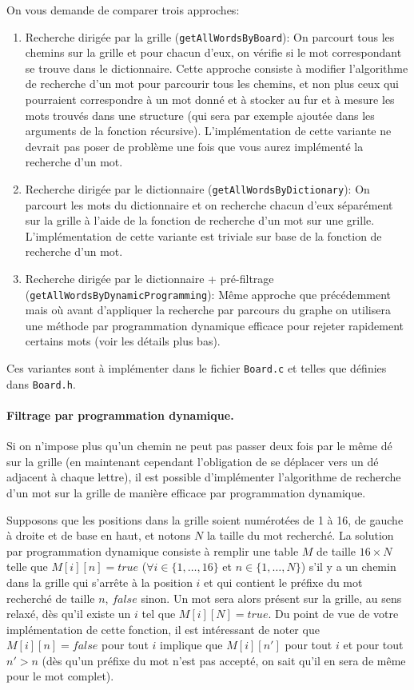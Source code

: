 \documentclass[a4paper,10pt]{article}
\begin{document}
On vous demande de comparer trois approches:
\begin{enumerate}
\item Recherche dirigée par la grille (\texttt{getAllWordsByBoard}): On parcourt tous les chemins
  sur la grille et pour chacun d'eux, on vérifie si le mot
  correspondant se trouve dans le dictionnaire. Cette approche consiste
  à modifier l'algorithme de recherche d'un mot pour parcourir tous
  les chemins, et non plus ceux qui pourraient correspondre à un mot
  donné et à stocker au fur et à mesure les mots trouvés dans une
  structure (qui sera par exemple ajoutée dans les arguments de la
  fonction récursive). L'implémentation de cette variante ne devrait
  pas poser de problème une fois que vous aurez implémenté la
  recherche d'un mot.
\item Recherche dirigée par le dictionnaire (\texttt{getAllWordsByDictionary}): On parcourt les mots du
  dictionnaire et on recherche chacun d'eux séparément sur la grille à
  l'aide de la fonction de recherche d'un mot sur une
  grille. L'implémentation de cette variante est triviale sur base de
  la fonction de recherche d'un mot.
\item Recherche dirigée par le dictionnaire + pré-filtrage (\texttt{getAllWordsByDynamicProgramming}): Même
  approche que précédemment mais où avant d'appliquer la recherche par
  parcours du graphe on utilisera une méthode par programmation
  dynamique efficace pour rejeter rapidement certains mots (voir les détails plus bas).
\end{enumerate}

Ces variantes sont à implémenter dans le fichier \texttt{Board.c} et telles que
définies dans \texttt{Board.h}.


\paragraph{Filtrage par programmation dynamique.}

Si on n'impose plus qu'un chemin ne peut pas passer deux fois par le
même dé sur la grille (en maintenant cependant l'obligation de se
déplacer vers un dé adjacent à chaque lettre), il est possible
d'implémenter l'algorithme de recherche d'un mot sur la grille de
manière efficace par programmation dynamique.

Supposons que les positions dans la grille soient numérotées de 1 à
16, de gauche à droite et de base en haut, et notons $N$ la taille du
mot recherché. La solution par programmation dynamique consiste à
remplir une table $M$ de taille $16\times N$ telle que $M[i][n]=true$
($\forall i\in\{1,\ldots,16\}$ et $n\in\{1,\ldots,N\}$) s'il y a un
chemin dans la grille qui s'arrête à la position $i$ et qui contient
le préfixe du mot recherché de taille $n$, $false$ sinon. Un mot sera
alors présent sur la grille, au sens relaxé, dès qu'il existe un $i$
tel que $M[i][N]=true$. Du point de vue de votre implémentation de
cette fonction, il est intéressant de noter que $M[i][n]=false$
pour tout $i$ implique que $M[i][n']$ pour tout $i$ et pour tout
$n'>n$ (dès qu'un préfixe du mot n'est pas accepté, on sait qu'il en
sera de même pour le mot complet).
\end{document}
